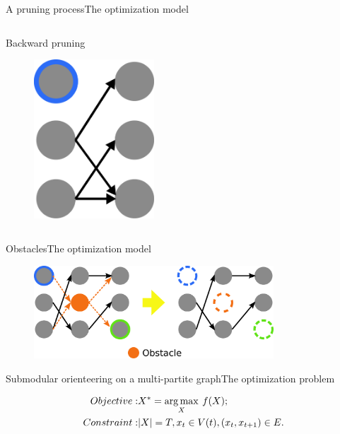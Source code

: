\begin{frame}{A pruning process}{The optimization model}
\begin{columns}
\begin{block}{Backward pruning}
\begin{figure}
\centering
\includegraphics[width = 0.4\textwidth]{./figure/backward_prune}
\end{figure}

\end{block}

\end{columns}

\end{frame}

\begin{frame}{Obstacles}{The optimization model}

\begin{figure}
\centering
\includegraphics[width = 0.8\textwidth]{./figure/obstacle}
\end{figure}

\end{frame}

\begin{frame}{Submodular orienteering on a multi-partite graph}{The optimization problem}

\begin{equation}
\nonumber
\begin{aligned}
Objective: & X^{*} = \operatorname*{arg\,max}_{X} \: f(X); \\
Constraint: & |X| = T, x_{t} \in V(t), (x_{t}, x_{t+1}) \in E.
\end{aligned}
\end{equation}

\end{frame}

